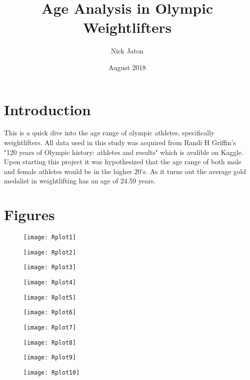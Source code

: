\documentclass{article}
\title{Age Analysis in Olympic Weightlifters}
\author{Nick Jaton}
\date{August 2018}
\begin{document}
\begin{titlepage}
\maketitle
\end{titlepage} 

 \section{Introduction} 
	This is a quick dive into the age range of olympic athletes, specifically weightlifters. All data used in this study was acquired from Randi H Griffin's "120 years of Olympic history: athletes and results" which is avalible on Kaggle. Upon starting this project it was hypothesized that the age range of both male and female athletes would be in the higher 20's. As it turns out the average gold medalist in weightlifting has an age of 24.59 years. 

\section{Figures}
\begin{figure}[ht!]
\centering
\texttt{[image: Rplot1]}
\end{figure}

\begin{figure}[ht!]
\centering
\texttt{[image: Rplot2]}
\end{figure}

\begin{figure}[ht!]
\centering
\texttt{[image: Rplot3]}
\end{figure}

\begin{figure}[ht!]
\centering
\texttt{[image: Rplot4]}
\end{figure}

\begin{figure}[ht!]
\centering
\texttt{[image: Rplot5]}
\end{figure}

\begin{figure}[ht!]
\centering
\texttt{[image: Rplot6]}
\end{figure}

\begin{figure}[ht!]
\centering
\texttt{[image: Rplot7]}
\end{figure}

\begin{figure}[ht!]
\centering
\texttt{[image: Rplot8]}
\end{figure}

\begin{figure}[ht!]
\centering
\texttt{[image: Rplot9]}
\end{figure}

\begin{figure}[ht!]
\centering
\texttt{[image: Rplot10]}
\end{figure}
\end{document}
